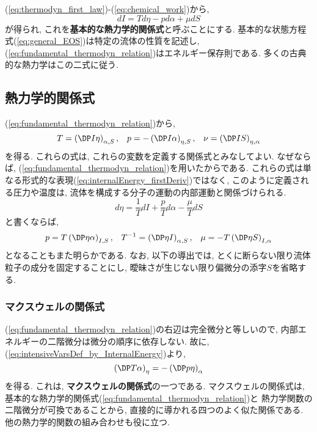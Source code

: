 (\ref{eq:thermodyn_first_law})-(\ref{eq:chemical_work})から, 
 \begin{equation}
 \boxed{
  dI = Td\eta - pd\alpha + \mu dS
   \label{eq:fundamental_thermodyn_relation}
 }
 \end{equation}
が得られ, これを\textbf{基本的な熱力学的関係式}と呼ぶことにする. 
基本的な状態方程式(\ref{eq:general_EOS})は特定の流体の性質を記述し, 
(\ref{eq:fundamental_thermodyn_relation})はエネルギー保存則である. 
多くの古典的な熱力学はこの二式に従う. 

\subsection{熱力学的関係式}
(\ref{eq:fundamental_thermodyn_relation})から, 
\begin{equation}
 T=\DPext{I}{\eta}{\alpha,S}, \;\;\;
 p=-\DPext{I}{\alpha}{\eta,S}, \;\;\;
 \nu=\DPext{I}{S}{\eta,\alpha}
 \label{eq:intensiveVarsDef_by_InternalEnergy}
\end{equation}
を得る. 
これらの式は, これらの変数を定義する関係式とみなしてよい. 
なぜならば, (\ref{eq:fundamental_thermodyn_relation})を用いたからである. 
これらの式は単なる形式的な表現(\ref{eq:internalEnergy_firstDeriv})ではなく, 
このように定義される圧力や温度は, 流体を構成する分子の運動の内部運動と関係づけられる. 
\begin{equation}
 d\eta = \dfrac{1}{T}dI + \dfrac{p}{T}d\alpha - \dfrac{\mu}{T}dS
\end{equation}
と書くならば, 
\begin{equation}
 p = T\DPext{\eta}{\alpha}{I,S}, \;\;\;
 T^{-1} = \DPext{\eta}{I}{\alpha,S}, \;\;\;
 \mu = -T\DPext{\eta}{S}{I,\alpha}
  \label{eq:intensiveVarsDef_by_Entropy}
\end{equation}
となることもまた明らかである. 
なお, 以下の導出では, とくに断らない限り流体粒子の成分を固定することにし, 
曖昧さが生じない限り偏微分の添字$S$を省略する. 

\subsubsection*{マクスウェルの関係式}
(\ref{eq:fundamental_thermodyn_relation})の右辺は完全微分と等しいので, 
内部エネルギーの二階微分は微分の順序に依存しない. 
故に, (\ref{eq:intensiveVarsDef_by_InternalEnergy})より, 
\begin{equation}
 \DPext{T}{\alpha}{\eta} = - \DPext{p}{\eta}{\alpha}
\end{equation}
を得る. 
これは, \textbf{マクスウェルの関係式}の一つである. 
マクスウェルの関係式は, 基本的な熱力学的関係式(\ref{eq:fundamental_thermodyn_relation})と
熱力学関数の二階微分が可換であることから, 
直接的に導かれる四つのよく似た関係である. 
他の熱力学的関数の組み合わせも役に立つ. 

